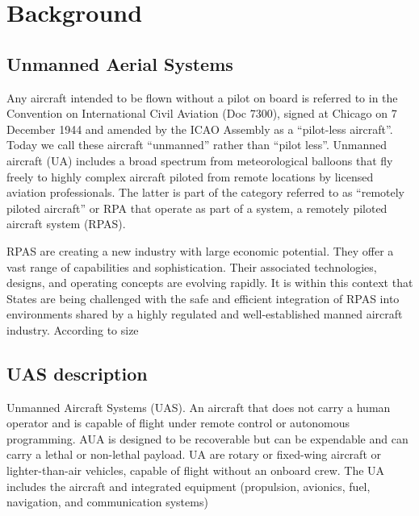 \section{Background}
\subsection{Unmanned Aerial Systems}
Any aircraft intended to be flown without a pilot on board is referred to in the Convention on International Civil Aviation (Doc 7300), signed at Chicago on 7 December 1944 and amended by the ICAO Assembly as a “pilot-less aircraft”. Today we call these aircraft “unmanned” rather than “pilot less”. Unmanned aircraft (UA) includes a broad spectrum from meteorological balloons that fly freely to highly complex aircraft piloted from remote locations by licensed aviation professionals. The latter is part of the category referred to as “remotely piloted aircraft” or RPA that operate as part of a system, a remotely piloted aircraft system (RPAS).

RPAS are creating a new industry with large economic potential. They offer a vast range of capabilities and sophistication. Their associated technologies, designs, and operating concepts are evolving rapidly. It is within this context that States are being challenged with the safe and efficient integration of RPAS into environments shared by a highly regulated and well-established manned aircraft industry. According to size\cite{ICAO}
\subsection{UAS description}
Unmanned Aircraft Systems (UAS). An aircraft that does not carry a human operator and is capable of flight under remote control or autonomous programming. AUA is designed to be recoverable but can be expendable and can carry a lethal or non-lethal payload. UA are rotary or fixed-wing aircraft or lighter-than-air vehicles, capable of flight without an onboard crew. The UA includes the aircraft and integrated equipment (propulsion, avionics, fuel, navigation, and communication systems)\cite{Joint}
